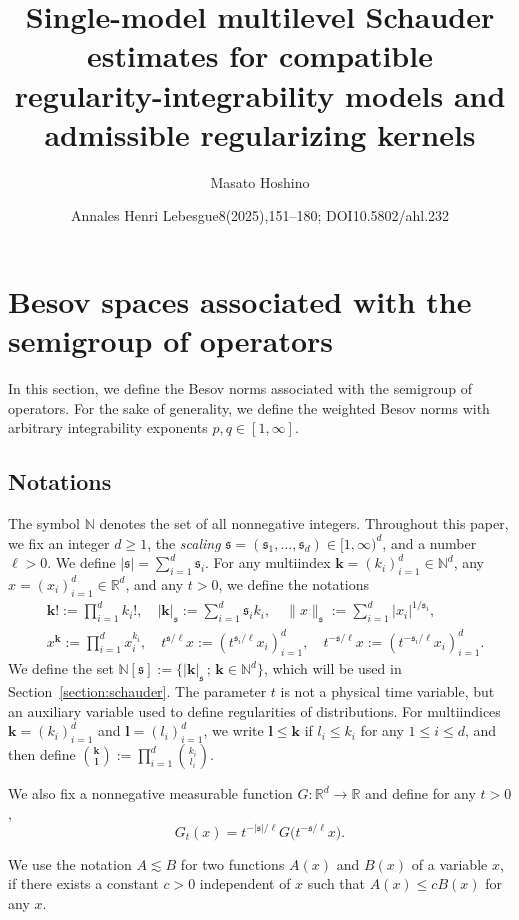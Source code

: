 \documentclass[10pt]{amsart}
\title[Single-model multilevel Schauder estimate]{Single-model multilevel Schauder estimates for compatible regularity-integrability models and admissible regularizing kernels}
\author{Masato Hoshino}
\date{Annales Henri Lebesgue8(2025),151–180; DOI10.5802/ahl.232}
\theoremstyle{definition}
\numberwithin{equation}{section}
\newcommand{\bbR}{\mathbb{R}}
\newcommand{\bbN}{\mathbb{N}}
\newcommand{\mfs}{\mathfrak{s}}
\newcommand{\bfk}{\mathbf{k}}
\newcommand{\bfl}{\mathbf{l}}
\begin{document}
\maketitle
\setcounter{section}{1}
\section{Besov spaces associated with the semigroup of operators}\label{section:semigroup}

In this section, we define the Besov norms associated with the semigroup of operators. For the sake of generality, we define the weighted Besov norms with arbitrary integrability exponents $p,q\in[1,\infty]$.

\subsection{Notations}\label{subsection:notation}

The symbol $\bbN$ denotes the set of all nonnegative integers. Throughout this paper, we fix an integer $d\ge1$, the \emph{scaling} $\mfs=(\mfs_1,\dots,\mfs_d)\in[1,\infty)^d$, and a number $\ell>0$. We define $|\mfs|=\sum_{i=1}^d\mfs_i$. For any multiindex ${\bfk}=(k_i)_{i=1}^d\in\bbN^d$, any $x=(x_i)_{i=1}^d\in\bbR^d$, and any $t>0$, we define the notations
\begin{align*}
&{\bfk}!:=\prod_{i=1}^dk_i!,\quad |{\bfk}|_{\mfs}:=\sum_{i=1}^d\mfs_ik_i,\quad
\|x\|_\mfs:=\sum_{i=1}^d|x_i|^{1/\mfs_i},\\
&x^{\bfk}:=\prod_{i=1}^dx_i^{k_i},\quad t^{\mfs/\ell}x:=\left(t^{\mfs_i/\ell}x_i\right)_{i=1}^d,\quad t^{-\mfs/\ell}x:=\left(t^{-\mfs_i/\ell}x_i\right)_{i=1}^d.
\end{align*}
We define the set $\bbN[\mfs]:=\{|{\bfk}|_\mfs\,;\,{\bfk}\in\bbN^d\}$, which will be used in Section~\ref{section:schauder}. The parameter $t$ is not a physical time variable, but an auxiliary variable used to define regularities of distributions. For multiindices ${\bfk}=(k_i)_{i=1}^d$ and ${\bfl}=(l_i)_{i=1}^d$, we write ${\bfl}\le{\bfk}$ if $l_i\le k_i$ for any $1\le i\le d$, and then define $\binom{{\bfk}}{{\bfl}}:=\prod_{i=1}^d\binom{k_i}{l_i}$.

We also fix a nonnegative measurable function $G:\bbR^d\to\bbR$ and define for any $t>0$,
\[
G_t(x)=t^{-|\mfs|/\ell}G\big(t^{-\mfs/\ell}x\big).
\]

We use the notation $A\lesssim B$ for two functions $A(x)$ and $B(x)$ of a variable $x$, if there exists a constant $c>0$ independent of $x$ such that $A(x)\le cB(x)$ for any $x$.
\end{document}
